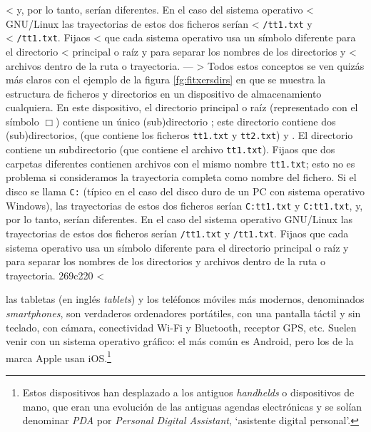 < y, por lo tanto, serían diferentes. En el caso del sistema operativo
< GNU/Linux las trayectorias de estos dos ficheros serían
< \texttt{/}\texttt{tt1.txt} y \\
< \texttt{/}\texttt{tt1.txt}. Fijaos
< que cada sistema operativo usa un símbolo diferente para el directorio
< principal o raíz y para separar los nombres de los directorios y
< archivos dentro de la ruta o trayectoria.
---
> Todos estos conceptos se ven quizás más claros con el ejemplo de la figura \ref{fg:fitxersdirs} en que se muestra la estructura de ficheros y directorios en un dispositivo de almacenamiento cualquiera. En este dispositivo, el directorio principal o raíz (representado con el símbolo $\Box$) contiene un único (sub)directorio ; este directorio contiene dos (sub)directorios,  (que contiene los ficheros \texttt{tt1.txt} y \texttt{tt2.txt}) y . El directorio  contiene un subdirectorio  (que contiene el archivo \texttt{tt1.txt}). Fijaos que dos carpetas diferentes contienen archivos con el mismo nombre \texttt{tt1.txt}; esto no es problema si consideramos la trayectoria completa como nombre del fichero. Si el disco se llama \texttt{C:} (típico en el caso del disco duro de un PC con sistema operativo Windows), las trayectorias de estos dos ficheros serían \texttt{C:}\barra{}\barra{}\barra\texttt{tt1.txt} y \texttt{C:}\barra{}\barra{}\barra{}\barra\texttt{tt1.txt}, y, por lo tanto, serían diferentes. En el caso del sistema operativo GNU/Linux las trayectorias de estos dos ficheros serían \texttt{/}\texttt{tt1.txt} y \texttt{/}\texttt{tt1.txt}. Fijaos que cada sistema operativo usa un símbolo diferente para el directorio principal o raíz y para separar los nombres de los directorios y archivos dentro de la ruta o trayectoria. 
269c220
< \item[Tabletas y \emph{smartphones}:] las tabletas (en inglés \emph{tablets}) y los teléfonos móviles más modernos, denominados \emph{smartphones}, son verdaderos ordenadores portátiles, con una pantalla táctil y sin teclado, con cámara, conectividad Wi-Fi y Bluetooth, receptor GPS, etc. Suelen venir con un sistema operativo gráfico: el más común es Android, pero los de la marca Apple usan iOS.\footnote{Estos dispositivos han desplazado a los antiguos \emph{handhelds} o dispositivos de mano, que eran una evolución de las antiguas agendas electrónicas y se solían denominar \emph{PDA} por \emph{Personal Digital Assistant}, `asistente digital personal'.} 
